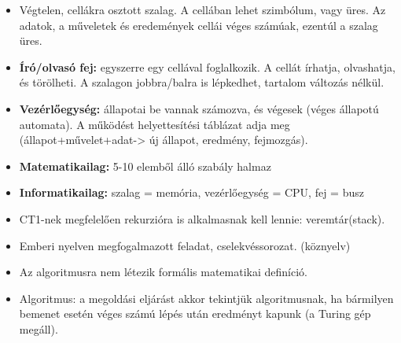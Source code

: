 \documentclass[12pt,a4paper]{article}
\begin{document}
            \begin{tcolorbox}[colback=blue!5!white,colframe=blue!50!black,title= 3. Ismertesse a Turing-gép felépítését és működését!]
            \begin{itemize}
                \item Végtelen, cellákra osztott szalag. A cellában lehet szimbólum, vagy üres. Az adatok, a műveletek és eredemények cellái véges számúak, ezentúl a szalag üres.
                \item \textbf{Író/olvasó fej:} egyszerre egy cellával foglalkozik. A cellát írhatja, olvashatja, és törölheti. A szalagon jobbra/balra is lépkedhet, tartalom változás nélkül.
                \item \textbf{Vezérlőegység:} állapotai be vannak számozva, és végesek (véges állapotú automata). A működést helyettesítési táblázat adja meg (állapot+művelet+adat-> új állapot, eredmény, fejmozgás).
                \item \textbf{Matematikailag:} 5-10 elemből álló szabály halmaz
                \item \textbf{Informatikailag:} szalag = memória, vezérlőegység = CPU, fej = busz
                \item CT1-nek megfelelően rekurzióra is alkalmasnak kell lennie: veremtár(stack).
            \end{itemize}
            \end{tcolorbox}

            \begin{tcolorbox}[colback=blue!5!white,colframe=blue!50!black,title= 4. Ismertesse az algoritmus köznyelvi és matematikai és Turing-géppel megfogalmazott definícióját!]
                \begin{itemize}
                    \item Emberi nyelven megfogalmazott feladat, cselekvéssorozat. (köznyelv)
                    \item Az algoritmusra nem létezik formális matematikai definíció.
                    \item Algoritmus: a megoldási eljárást akkor tekintjük algoritmusnak, ha bármilyen bemenet esetén véges számú lépés után eredményt kapunk (a Turing gép megáll).
                \end{itemize}
            \end{tcolorbox}
\end{document}
